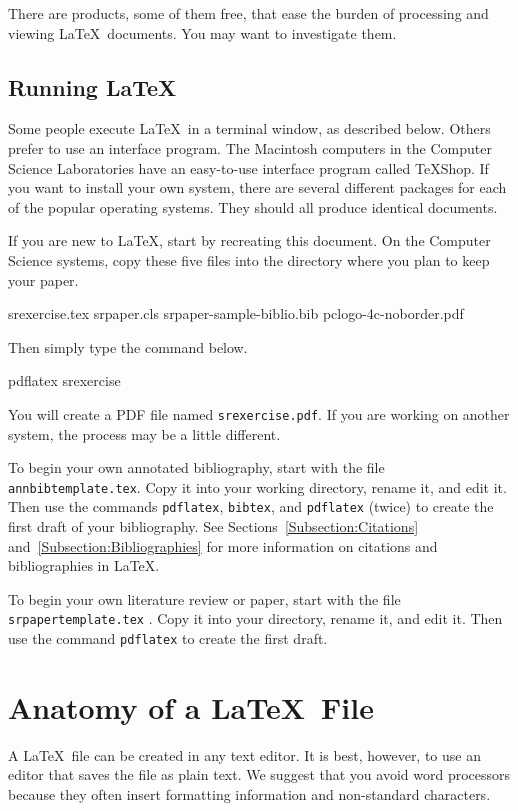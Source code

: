 \documentclass[finalcopy]{srpaper}
\def\hyperref[#1]{}
\let\plainref\ref
\newcommand{\plainref}{\ref*}
\newcommand{\namedref}[2]{\hyperref[#2]{#1~\plainref{#2}}}
\def\BibTeX{{\rm B\kern-.05em{\sc i\kern-.025em b}\kern-.08em
    T\kern-.1667em\lower.7ex\hbox{E}\kern-.125emX}}
\begin{document}
There are products, some of them
free, that ease the burden of processing and viewing
\LaTeX\ documents. You may want to investigate them.

\subsection{Running \LaTeX}
Some people execute \LaTeX\ in a terminal window,
as described below. Others prefer to use an interface
program. The Macintosh computers in the Computer Science
Laboratories have an easy-to-use interface program called
TeXShop. If you want to install your own system, there are
several different packages for each of the popular
operating systems. They should all produce identical
documents.

If you are new to \LaTeX, start by recreating this
document. On the Computer Science systems, copy these five
files into the directory where you plan to keep your
paper.%
\begin{code}
srexercise.tex
srpaper.cls
srpaper-sample-biblio.bib
pclogo-4c-noborder.pdf
\end{code}
Then simply type the command below.
\begin{code}
pdflatex srexercise
\end{code}
You will create a PDF file named
\texttt{srexercise.pdf}.
If you are working on another system, the process may
be a little different.

To begin your own annotated bibliography,
%
\index{bibtex@\BibTeX!running} start with the
file \texttt{annbib\discretionary{-}{}{-}template.tex}.%
 Copy
it into your working directory, rename it, and edit it. Then
use the commands \texttt{pdflatex}, \texttt{bibtex}, and
\texttt{pdflatex} (twice) to create the first draft of your
bibliography. See \namedref{Sections}{Subsection:Citations}
and~\ref{Subsection:Bibliographies} for more information on
citations and bibliographies in \LaTeX.

To begin your own literature review or paper,
 start with the
file
\texttt{srpaper\discretionary{-}{}{-}template.tex}%
. Copy it
into your directory, rename it, and edit it. Then use the
command \texttt{pdflatex} to create the first draft.


\section{Anatomy of a \LaTeX\ File}
\label{Section:LaTeXAnatomy}
A \LaTeX\ file can be created in any text editor. It is
best, however, to use an editor that saves the file as plain
text. We suggest that you avoid word processors because they
often insert formatting information and non-standard
characters.
\end{document}
